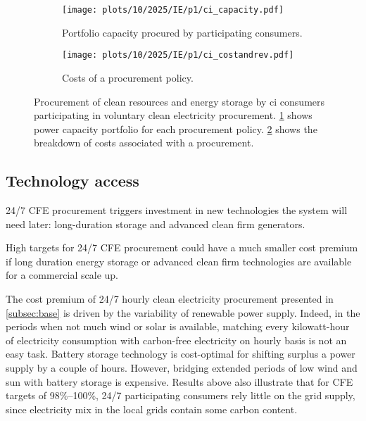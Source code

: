 \begin{figure}
    \centering
    \begin{subfigure}[t]{0.95\columnwidth}
        \centering
        \caption{Portfolio capacity procured by participating consumers.}
        \texttt{[image: plots/10/2025/IE/p1/ci\_capacity.pdf]}
        \label{fig:10-2025-IE-p1-ci_capacity}
    \end{subfigure}
    \begin{subfigure}[t]{0.95\columnwidth}
        \centering
        \vspace{-0.5cm}
        \caption{Costs of a procurement policy.}
        \texttt{[image: plots/10/2025/IE/p1/ci\_costandrev.pdf]}
        \label{fig:10-2025-IE-p1-ci_costandrev}
    \end{subfigure}
    \caption{Procurement of clean resources and energy storage by \gls{ci} consumers participating in voluntary clean electricity procurement. 
    \cref{fig:10-2025-IE-p1-ci_capacity} shows power capacity portfolio for each procurement policy.
    \cref{fig:10-2025-IE-p1-ci_costandrev} shows the breakdown of costs associated with a procurement.}
    \label{fig:10-2025-IE-p1-ci_procurement}
\end{figure}


\subsection{Technology access}
\label{subsec:palette}

\vspace{10pt}
\begin{res}
    24/7 CFE procurement triggers investment in new technologies the system will need later: long-duration storage and advanced clean firm generators.
\end{res}

\vspace*{5pt}
\begin{res}
    High targets for 24/7 CFE procurement could have a much smaller cost premium if long duration energy storage or advanced clean firm technologies are available for a commercial scale up.
\end{res}

The cost premium of 24/7 hourly clean electricity procurement presented in \cref{subsec:base} is driven by the variability of renewable power supply.
Indeed, in the periods when not much wind or solar is available, matching every kilowatt-hour of electricity consumption with carbon-free electricity on hourly basis is not an easy task.
Battery storage technology is cost-optimal for shifting surplus a power supply by a couple of hours. 
However, bridging extended periods of low wind and sun with battery storage is expensive.
Results above also illustrate that for CFE targets of 98\%--100\%, 24/7 participating consumers rely little on the grid supply, since electricity mix in the local grids contain some carbon content.

